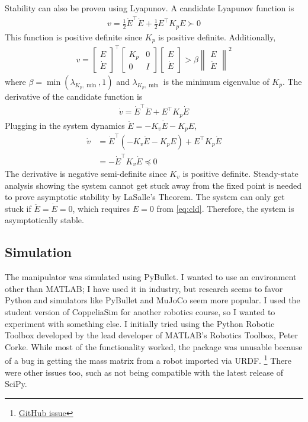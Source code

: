 \documentclass{article}
\begin{document}
Stability can also be proven using Lyapunov. A candidate Lyapunov function is
\begin{align}
  v = \frac{1}{2} \dot{E}^\top \dot{E} + \frac{1}{2} E^\top K_p E \succ 0
\end{align}
This function is positive definite since $K_p$ is positive definite. Additionally,
\begin{align}
  v = \begin{bmatrix}
    E \\
    \dot{E}
  \end{bmatrix}^\top \begin{bmatrix}
    K_p & 0 \\
    0 & I
  \end{bmatrix} \begin{bmatrix}
    E \\
    \dot{E}
  \end{bmatrix} > \beta \begin{Vmatrix}
    E \\
    \dot{E}
  \end{Vmatrix}^2
\end{align}
where $\beta = \min(\lambda_{K_p, \min}, 1)$ and $\lambda_{K_p, \min}$ is the minimum eigenvalue of $K_p$. The
derivative of the candidate function is
\begin{align}
  \dot{v} = \dot{E}^\top \ddot{E} + E^\top K_p \dot{E}
\end{align}
Plugging in the system dynamics $\ddot{E} = -K_v \dot{E} - K_p E$,
\begin{equation}
\begin{aligned}
  \dot{v} &= \dot{E}^\top (-K_v \dot{E} - K_p E) + E^\top K_p \dot{E} \\
          &= -\dot{E}^\top K_v \dot{E} \preceq 0
\end{aligned}
\end{equation}
The derivative is negative semi-definite since $K_v$ is positive definite.
Steady-state analysis showing the system cannot get stuck away from the fixed point is needed to prove asymptotic
stability by LaSalle's Theorem.
The system can only get stuck if $\ddot{E} = \dot{E} = 0$,
which requires $E = 0$ from \eqref{eq:cld}.
Therefore, the system is asymptotically stable.

\subsection{Simulation}

The manipulator was simulated using PyBullet.
I wanted to use an environment other than MATLAB;
I have used it in industry, but research seems to favor Python and simulators like PyBullet and MuJoCo seem more popular.
I used the student version of CoppeliaSim for another robotics course,
so I wanted to experiment with something else.
I initially tried using the Python Robotic Toolbox developed by the lead developer of MATLAB's Robotics Toolbox,
Peter Corke.
While most of the functionality worked,
the package was unusable because of a bug in getting the mass matrix from a robot imported via URDF.
\footnote{\href{https://github.com/petercorke/robotics-toolbox-python/issues/368}{GitHub issue}}
There were other issues too, such as not being compatible with the latest release of SciPy.
\end{document}
